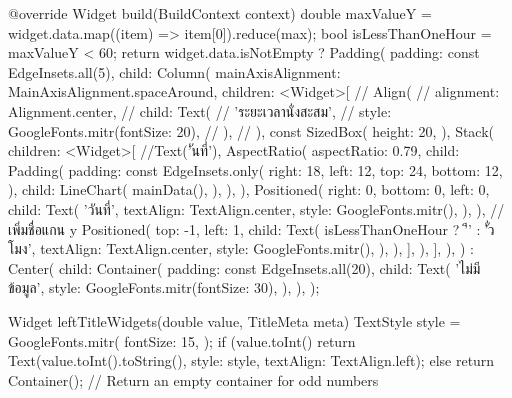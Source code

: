 {  @override
  Widget build(BuildContext context) {
    double maxValueY = widget.data.map((item) => item[0]).reduce(max);
    bool isLessThanOneHour = maxValueY < 60;
    return widget.data.isNotEmpty
        ? Padding(
            padding: const EdgeInsets.all(5),
            child: Column(
              mainAxisAlignment: MainAxisAlignment.spaceAround,
              children: <Widget>[
                // Align(
                //   alignment: Alignment.center,
                //   child: Text(
                //     'ระยะเวลานั่งสะสม',
                //     style: GoogleFonts.mitr(fontSize: 20),
                //   ),
                // ),
                const SizedBox(
                  height: 20,
                ),
                Stack(
                  children: <Widget>[
                    //Text('ันที่'),
                    AspectRatio(
                      aspectRatio: 0.79,
                      child: Padding(
                        padding: const EdgeInsets.only(
                          right: 18,
                          left: 12,
                          top: 24,
                          bottom: 12,
                        ),
                        child: LineChart(
                          mainData(),
                        ),
                      ),
                    ),
                    Positioned(
                      right: 0,
                      bottom: 0,
                      left: 0,
                      child: Text(
                        'วันที่',
                        textAlign: TextAlign.center,
                        style: GoogleFonts.mitr(),
                      ),
                    ),
                    // เพิ่มชื่อแกน y
                    Positioned(
                      top: -1,
                      left: 1,
                      child: Text(
                        isLessThanOneHour ? 'ี' : 'ั่วโมง',
                        textAlign: TextAlign.center,
                        style: GoogleFonts.mitr(),
                      ),
                    ),
                  ],
                ),
              ],
            ),
          )
        : Center(
            child: Container(
              padding: const EdgeInsets.all(20),
              child: Text(
                'ไม่มีข้อมูล',
                style: GoogleFonts.mitr(fontSize: 30),
              ),
            ),
          );
  }

  Widget leftTitleWidgets(double value, TitleMeta meta) {
    TextStyle style = GoogleFonts.mitr(
      fontSize: 15,
    );
    if (value.toInt() %
      return Text(value.toInt().toString(),
          style: style, textAlign: TextAlign.left);
    } else {
      return Container(); // Return an empty container for odd numbers
    }
  }

